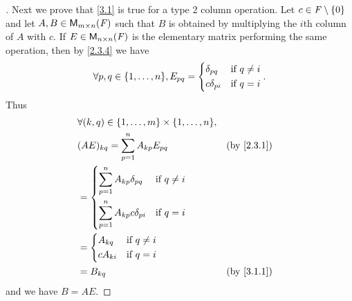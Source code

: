 \begin{proof}[]
	Next we prove that \cref{3.1} is true for a type 2 column operation.
	Let \(c \in \mathit{F} \setminus \left\lbrace0\right\rbrace\) and let \(A, B \in \MS\) such that \(B\) is obtained by multiplying the \(i\)th column of \(A\) with \(c\).
	If \(E \in \ms[n][n][\F]\) is the elementary matrix performing the same operation, then by \cref{2.3.4} we have
	\[
		\forall p, q \in \set{1, \dots, n}, E_{p q} = \begin{dcases}
			\delta_{p q}   & \text{if } q \neq i \\
			c \delta_{p i} & \text{if } q = i
		\end{dcases}.
	\]
	Thus
	\begin{align*}
		 & \forall (k, q) \in \set{1, \dots, m} \times \set{1, \dots, n},                 \\
		 & (AE)_{k q} = \sum_{p = 1}^n A_{k p} E_{p q}                    &  & \by{2.3.1} \\
		 & = \begin{dcases}
			     \sum_{p = 1}^n A_{k p} \delta_{p q}   & \text{if } q \neq i \\
			     \sum_{p = 1}^n A_{k p} c \delta_{p i} & \text{if } q = i
		     \end{dcases}                  \\
		 & = \begin{dcases}
			     A_{k q}   & \text{if } q \neq i \\
			     c A_{k i} & \text{if } q = i
		     \end{dcases}                                              \\
		 & = B_{k q}                                                      &  & \by{3.1.1}
	\end{align*}
	and we have \(B = AE\).


\end{proof}
